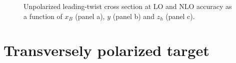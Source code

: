 \begin{figure}
    \centering
    \caption{Unpolarized leading-twist cross section at LO and NLO accuracy as a function of $x_B$ (panel a), $y$ (panel b) and $z_h$ (panel c).}
    \label{fig:plotNLOUUU}
\end{figure} 



\clearpage

\section{Transversely polarized target}
